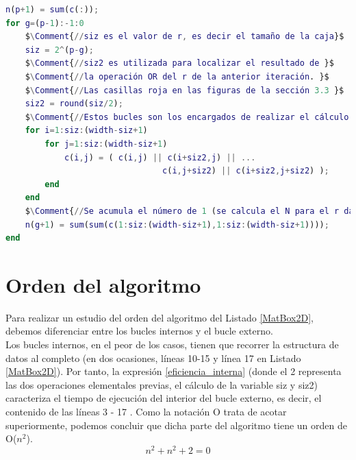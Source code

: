 \begin{lstlisting}[language=Matlab,caption={Código Matlab del método Box counting para matrices bidimensionales. Las variables de entrada del código son la matriz c (matriz binaria que queremos analizar), la lista n (inicialmente vacía, contendrá el número de cajas válidas para cada tamaño de caja) y la variable p. que representa el número de iteraciones necesarias para cubrir la matriz entera, teniendo en cuenta que cada iteración aumenta el tamaño de la caja en una potencia de dos.},label=MatBox2D]
n(p+1) = sum(c(:));
for g=(p-1):-1:0
    $\Comment{//siz es el valor de r, es decir el tamaño de la caja}$
    siz = 2^(p-g);
    $\Comment{//siz2 es utilizada para localizar el resultado de }$
    $\Comment{//la operación OR del r de la anterior iteración. }$
    $\Comment{//Las casillas roja en las figuras de la sección 3.3 }$
    siz2 = round(siz/2);
    $\Comment{//Estos bucles son los encargados de realizar el cálculo del OR}$
    for i=1:siz:(width-siz+1)
        for j=1:siz:(width-siz+1)
            c(i,j) = ( c(i,j) || c(i+siz2,j) || ...
                                c(i,j+siz2) || c(i+siz2,j+siz2) );
        end
    end
    $\Comment{//Se acumula el número de 1 (se calcula el N para el r dado)}$
    n(g+1) = sum(sum(c(1:siz:(width-siz+1),1:siz:(width-siz+1))));
end
\end{lstlisting}

\section{Orden del algoritmo}
\label{Orden}
Para realizar un estudio del orden del algoritmo del Listado \ref{MatBox2D}, debemos diferenciar entre los bucles internos y el bucle  externo.\\

Los bucles internos, en el peor de los casos, tienen que recorrer la estructura de datos al completo (en dos ocasiones, líneas 10-15 y línea 17 en Listado \ref{MatBox2D}). Por tanto, la expresión \ref{eficiencia_interna} (donde el 2 representa las dos operaciones elementales previas, el cálculo de la variable siz y siz2) caracteriza el tiempo de ejecución del interior del bucle externo, es decir, el contenido de las líneas 3 - 17 . Como la notación O trata de acotar superiormente, podemos concluir que dicha parte del algoritmo tiene un orden de O($n^2$).\\

\begin{equation}
    \label{eficiencia_interna}
    n^2 + n^2 + 2 = 0
\end{equation}

